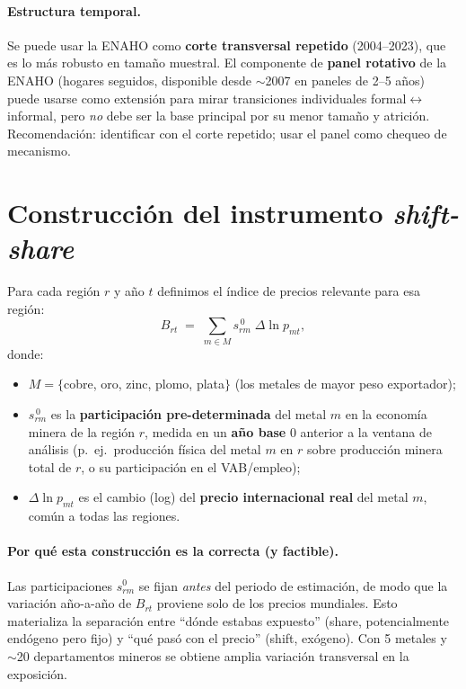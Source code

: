 \documentclass[11pt]{article}
\begin{document}
\paragraph{Estructura temporal.} Se puede usar la ENAHO como \textbf{corte transversal
repetido} (2004--2023), que es lo más robusto en tamaño muestral. El componente de
\textbf{panel rotativo} de la ENAHO (hogares seguidos, disponible desde $\sim$2007 en paneles
de 2--5 años) puede usarse como extensión para mirar transiciones individuales
formal$\leftrightarrow$informal, pero \emph{no} debe ser la base principal por su menor tamaño
y atrición. Recomendación: identificar con el corte repetido; usar el panel como chequeo de
mecanismo.

\section{Construcción del instrumento \textit{shift-share}}

Para cada región $r$ y año $t$ definimos el índice de precios relevante para esa región:
\begin{equation}
B_{rt} \;=\; \sum_{m \in M} s_{rm}^{\,0}\; \Delta \ln p_{mt},
\label{eq:bartik}
\end{equation}
donde:
\begin{itemize}[leftmargin=1.4em, itemsep=1pt]
  \item $M=\{$cobre, oro, zinc, plomo, plata$\}$ (los metales de mayor peso exportador);
  \item $s_{rm}^{\,0}$ es la \textbf{participación pre-determinada} del metal $m$ en la
  economía minera de la región $r$, medida en un \textbf{año base} $0$ anterior a la ventana
  de análisis (p.\ ej.\ producción física del metal $m$ en $r$ sobre producción minera total
  de $r$, o su participación en el VAB/empleo);
  \item $\Delta \ln p_{mt}$ es el cambio (log) del \textbf{precio internacional real} del
  metal $m$, común a todas las regiones.
\end{itemize}

\paragraph{Por qué esta construcción es la correcta (y factible).} Las participaciones
$s_{rm}^{0}$ se fijan \emph{antes} del periodo de estimación, de modo que la variación
año-a-año de $B_{rt}$ proviene solo de los precios mundiales. Esto materializa la separación
entre ``dónde estabas expuesto'' (share, potencialmente endógeno pero fijo) y ``qué pasó con
el precio'' (shift, exógeno). Con 5 metales y $\sim$20 departamentos mineros se obtiene amplia
variación transversal en la exposición.
\end{document}
